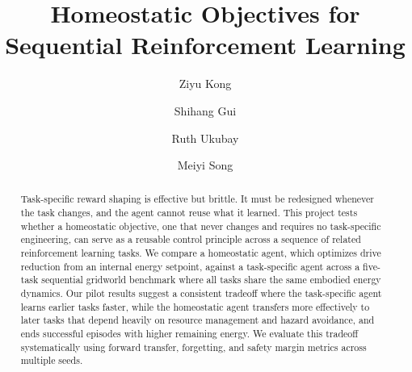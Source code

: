 \documentclass[sigplan,10pt]{acmart}
\begin{document}
\title{Homeostatic Objectives for Sequential Reinforcement Learning}

\author{Ziyu Kong}

\author{Shihang Gui}

\author{Ruth Ukubay}

\author{Meiyi Song}







\begin{abstract}
Task-specific reward shaping is effective but brittle. It must be
redesigned whenever the task changes, and the agent cannot reuse what
it learned. This project tests whether a homeostatic objective,
one that never changes and requires no task-specific engineering,
can serve as a reusable control principle across a sequence of related
reinforcement learning tasks. We compare a homeostatic agent, which
optimizes drive reduction from an internal energy setpoint, against a
task-specific agent across a five-task sequential gridworld benchmark
where all tasks share the same embodied energy dynamics. Our pilot
results suggest a consistent tradeoff where the task-specific agent learns earlier tasks faster, while the homeostatic agent transfers more
effectively to later tasks that depend heavily on resource management
and hazard avoidance, and ends successful episodes with higher
remaining energy. We evaluate this tradeoff systematically using
forward transfer, forgetting, and safety margin metrics across
multiple seeds.
\end{abstract}
 
\maketitle
 
 
\end{document}
